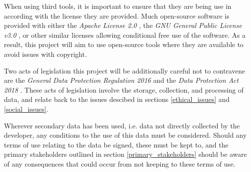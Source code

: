 %
%
%

When using third tools, it is important to ensure that they are being use in according with the license they are provided.
Much open-source software is provided with either the \textit{Apache License 2.0} \cite{apache_2_0}, the \textit{GNU General Public License v3.0} \cite{gnu_gpl_3}, or other similar licenses allowing conditional free use of the software.
As a result, this project will aim to use open-source tools where they are available to avoid issues with copyright.

Two acts of legislation this project will be additionally careful not to contravene are the \textit{General Data Protection Regulation 2016} \cite{eu_2016_679} and the \textit{Data Protection Act 2018} \cite{uk_dpa_2018}. These acts of legislation involve the storage, collection, and processing of data, and relate back to the issues descibed in sections \ref{ethical_issues} and \ref{social_issues}.

Wherever secondary data has been used, i.e. data not directly collected by the developer, any conditions to the use of this data must be considered. Should any terms of use relating to the data be signed, these must be kept to, and the primary stakeholders outlined in section \ref{primary_stakeholders} should be aware of any consequences that could occur from not keeping to these terms of use.
